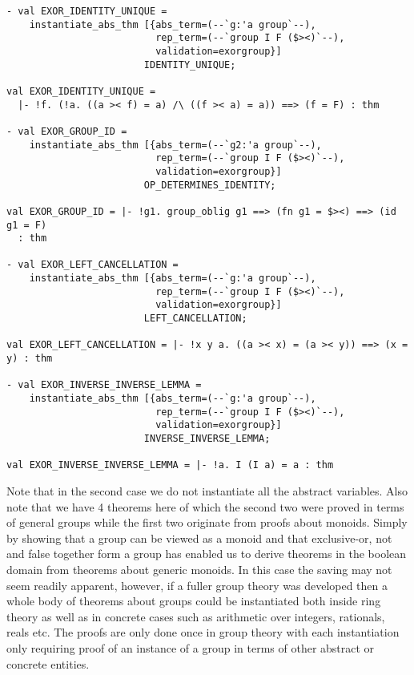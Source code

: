 \begin{small}
\begin{verbatim}
- val EXOR_IDENTITY_UNIQUE =
    instantiate_abs_thm [{abs_term=(--`g:'a group`--),
                          rep_term=(--`group I F ($><)`--),
                          validation=exorgroup}]
                        IDENTITY_UNIQUE;

val EXOR_IDENTITY_UNIQUE =
  |- !f. (!a. ((a >< f) = a) /\ ((f >< a) = a)) ==> (f = F) : thm

- val EXOR_GROUP_ID =       
    instantiate_abs_thm [{abs_term=(--`g2:'a group`--),
                          rep_term=(--`group I F ($><)`--),
                          validation=exorgroup}]
                        OP_DETERMINES_IDENTITY;

val EXOR_GROUP_ID = |- !g1. group_oblig g1 ==> (fn g1 = $><) ==> (id g1 = F)
  : thm

- val EXOR_LEFT_CANCELLATION =
    instantiate_abs_thm [{abs_term=(--`g:'a group`--),
                          rep_term=(--`group I F ($><)`--),
                          validation=exorgroup}]
                        LEFT_CANCELLATION;

val EXOR_LEFT_CANCELLATION = |- !x y a. ((a >< x) = (a >< y)) ==> (x = y) : thm
    
- val EXOR_INVERSE_INVERSE_LEMMA =
    instantiate_abs_thm [{abs_term=(--`g:'a group`--),
                          rep_term=(--`group I F ($><)`--),
                          validation=exorgroup}]
                        INVERSE_INVERSE_LEMMA;

val EXOR_INVERSE_INVERSE_LEMMA = |- !a. I (I a) = a : thm
\end{verbatim}
\end{small}

Note that in the second case we do not instantiate all the abstract
variables. Also note that we have 4 theorems here of which the second
two were proved in terms of general groups while the first two originate
from proofs about monoids. Simply by showing that a group can be viewed
as a monoid and that exclusive-or, not and false together form a group
has enabled us to derive theorems in the boolean domain from theorems
about generic monoids. In this case the saving may not seem readily
apparent, however, if a fuller group theory was developed then a whole
body of theorems about groups could be instantiated both inside ring
theory as well as in concrete cases such as arithmetic over integers,
rationals, reals etc. The proofs are only done once in group theory with
each instantiation only requiring proof of an instance of a group in
terms of other abstract or concrete entities.


